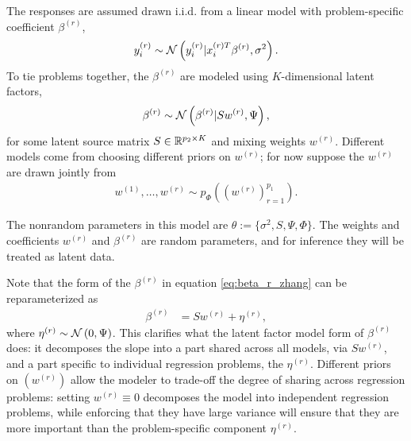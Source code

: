 \documentclass[14pt]{extarticle}
\begin{document}
The responses are assumed drawn i.i.d. from a linear model with problem-specific
coefficient $\beta^{(r)}$,
\begin{align*}
  y_{i}^{(r)} \sim \mathcal{N}\left(y_i^{(r)} \vert x_{i}^{(r) T}\beta^{(r)}, \sigma^{2}\right).
\end{align*}
To tie problems together, the $\beta^{(r)}$ are modeled using $K$-dimensional
latent factors,
\begin{align}
  \beta^{(r)} \sim \mathcal{N}\left(\beta^{(r)} \vert S w^{(r)}, \Psi\right), \label{eq:beta_r_zhang}
\end{align}
for some latent source matrix $S \in \mathbb{R}^{p_{2} \times K}$ and mixing weights
$w^{(r)}$. Different models come from choosing different priors on $w^{(r)}$;
for now suppose the $w^{(r)}$ are drawn jointly from
\begin{align*}
w^{(1)}, \dots, w^{(r)} \sim  p_{\Phi}\left(\left(w^{\left(r\right)}\right)_{r = 1}^{p_{1}}\right).
\end{align*}

The nonrandom parameters in this model are $\theta := \{\sigma^{2}, S, \Psi,
\Phi\}$. The weights and coefficients $w^{(r)}$ and $\beta^{(r)}$ are random
parameters, and for inference they will be treated as latent data.

Note that the form of the $\beta^{(r)}$ in equation \ref{eq:beta_r_zhang} can
be reparameterized as
\begin{align*}
\beta^{(r)} &= Sw^{(r)} + \eta^{(r)},
\end{align*}
where $\eta^{(r)} \sim \mathcal{N}\left(0, \Psi\right)$. This clarifies what the latent
factor model form of $\beta^{(r)}$ does: it decomposes the slope into a part
shared across all models, via $Sw^{(r)}$, and a part specific to individual
regression problems, the $\eta^{(r)}$. Different priors on
$\left(w^{(r)}\right)$ allow the modeler to trade-off the degree of sharing
across regression problems: setting $w^{(r)} \equiv 0$ decomposes the model into
independent regression problems, while enforcing that they have large variance
will ensure that they are more important than the problem-specific component
$\eta^{(r)}$.
\end{document}
